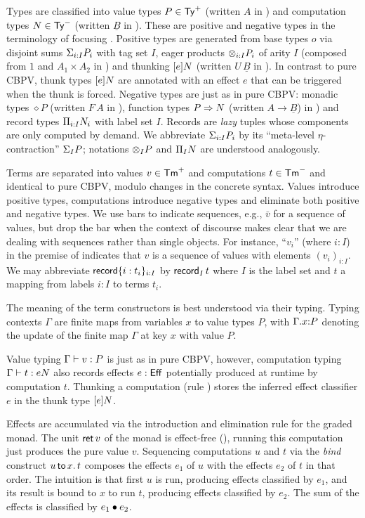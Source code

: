 \documentclass[acmsmall,review,anonymous]{acmart}\settopmatter{printfolios=true,printccs=false,printacmref=false}
\begin{document}
Types are classified into value types $P \in \PTy$ (written $A$ in
\citet{levy:hosc06}) and computation types $N \in \NTy$
(written $\underline B$ in
\loccit).  These are positive and negative types in the terminology of
focusing \cite{zeilberger:PhD}.
Positive types are generated from base types $o$ via
disjoint sums $\sumty i I P$ with tag set $I$, eager products $\tupty
i I P$ of arity $I$ (composed
from $1$ and $A_1 \times A_2$ in \loccit) and thunking $\thunkty e N$
(written $U\,\underline B$ in \loccit).  In contrast to pure CBPV,
thunk types $\thunkty e N$ are annotated with an effect $e$ that can
be triggered when the thunk is forced.  Negative types are just as in
pure CBPV: monadic types $\diamond P$ (written $F\,A$ in \loccit),
function types $P \To N$ (written $A \to \underline B$) in \loccit)
and record types $\recty i I N$ with label set $I$.
Records are \emph{lazy} tuples whose components are only computed by demand.
We abbreviate $\sumty i I P$ by its ``meta-level $\eta$-contraction''
$\sumt I P$; notations $\tupt I P$ and
$\rect I N$ are understood analogously.

Terms are separated into values $v \in \PTm$ and computations $t \in
\NTm$ and identical to pure CBPV, modulo changes in the concrete
syntax.  Values introduce positive types,
computations introduce
negative types and
eliminate both positive and negative types.
We use bars to indicate sequences, e.g., $\bar v$ for a
sequence of values, but drop the bar when the context of discourse
makes clear that we are dealing with sequences rather than single
objects.  For instance, ``$v_i$'' (where $i : I$) in the premise of
\rintro\otimes indicates that $v$ is a sequence of values with
elements $(v_i)_{i:I}$.  We may abbreviate $\trecord \{i :
t_i\}_{i:I}$ by $\recrd I t$ where $I$ is the label set and $t$ a
mapping from labels $i:I$ to terms $t_i$.

The meaning of the term constructors is best understood via their
typing.  Typing contexts $\Gamma$ are finite maps from variables $x$
to value types $P$, with $\ext \Gamma x P$ denoting the update of the
finite map $\Gamma$ at key $x$ with value $P$.

Value typing $\ValTy \Gamma v P$ is just as in pure CBPV, however,
computation typing $\CompTy \Gamma t e N$ also records effects $e :
\Eff$ potentially produced at runtime by computation $t$.  Thunking a
computation (rule \rintro\Box) stores the inferred effect classifier
$e$ in the thunk type $\thunkty e N$.

Effects are accumulated via the introduction and elimination rule for
the graded monad.  The unit $\ret v$ of the monad is effect-free
(\rintro\diamond), running this computation just produces the pure
value $v$.  Sequencing computations $u$ and $t$ via the \emph{bind}
construct $\bind x u t$ composes the effects $e_1$ of $u$ with the
effects $e_2$ of $t$ in that order.  The intuition is that first $u$
is run, producing effects classified by $e_1$, and its result is bound
to $x$ to run $t$, producing effects classified by $e_2$.  The sum of
the effects is classified by $e_1 \bu e_2$.
\end{document}

